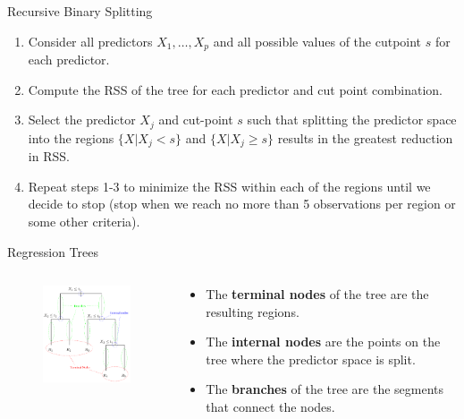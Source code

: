 \documentclass[
  ignorenonframetext,
  aspectratio=169,
]{beamer}
\begin{document}
\begin{frame}{Recursive Binary Splitting}
\protect\hypertarget{recursive-binary-splitting}{}
\begin{enumerate}
\item
  Consider all predictors \(X_1, \dots, X_p\) and all possible values of
  the cutpoint \(s\) for each predictor.
\item
  Compute the RSS of the tree for each predictor and cut point
  combination.
\item
  Select the predictor \(X_j\) and cut-point \(s\) such that splitting
  the predictor space into the regions \(\{X|X_j < s\}\) and
  \(\{X|X_j \geq s\}\) results in the greatest reduction in RSS.
\item
  Repeat steps 1-3 to minimize the RSS within each of the regions until
  we decide to stop (stop when we reach no more than 5 observations per
  region or some other criteria).
\end{enumerate}
\end{frame}

\begin{frame}{Regression Trees}
\protect\hypertarget{regression-trees-1}{}
\begin{columns}[T]
\begin{column}{0.5\textwidth}
\begin{figure}

{\centering \includegraphics[width=2.34375in,height=\textheight]{images/tree diagram.png}

}

\end{figure}
\end{column}

\begin{column}{0.5\textwidth}
\begin{itemize}
\item
  The \textbf{terminal nodes} of the tree are the resulting regions.
\item
  The \textbf{internal nodes} are the points on the tree where the
  predictor space is split.
\item
  The \textbf{branches} of the tree are the segments that connect the
  nodes.
\end{itemize}
\end{column}
\end{columns}
\end{frame}
\end{document}
